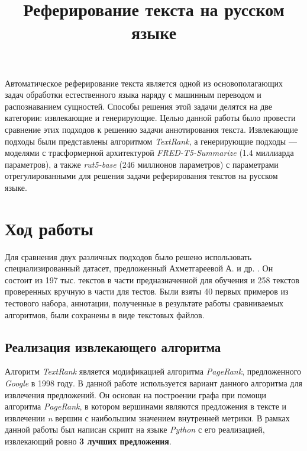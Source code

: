 \documentclass[12pt, a4paper]{article}
\title{Реферирование текста на русском языке}
\begin{document}
	\maketitle

	\tableofcontents
	
	\begin{introduction}
        Автоматическое реферирование текста является одной из основополагающих задач обработки естественного языка наряду с машинным переводом и распознаванием сущностей. Способы решения этой задачи делятся на две категории: извлекающие и генерирующие. Целью данной работы было провести сравнение этих подходов к решению задачи аннотирования текста. Извлекающие подходы были представлены алгоритмом \textit{TextRank}, а генерирующие подходы --- моделями с трасформерной архитектурой \textit{FRED-T5-Summarize} (1.4 миллиарда параметров), а также \textit{rut5-base} (246 миллионов параметров) с параметрами отрегулированными для решения задачи реферирования текстов на русском языке.  
	\end{introduction}
	
	\section{Ход работы}

    Для сравнения двух различных подходов было решено использовать специализированный датасет, предложенный Ахметгареевой А. и др. \cite{dataset}. Он состоит из 197 тыс. текстов в части предназначенной для обучения и 258 текстов проверенных вручную в части для тестов. Были взяты 40 первых примеров из тестового набора, аннотации, полученные в результате работы сравниваемых алгоритмов, были сохранены в виде текстовых файлов.

    \subsection{Реализация извлекающего алгоритма}
    Алгоритм \textit{TextRank} является модификацией алгоритма \textit{PageRank}, предложенного \textit{Google} в 1998 году. В данной работе используется вариант данного алгоритма для извлечения предложений. Он основан на построении графа при помощи алгоритма \textit{PageRank}, в котором вершинами являются предложения в тексте и извлечении \textit{n} вершин с наибольшим значением внутренней метрики. В рамках данной работы был написан скрипт на языке \textit{Python} с его реализацией, извлекающий ровно \textbf{3 лучших предложения}. 
\end{document}
